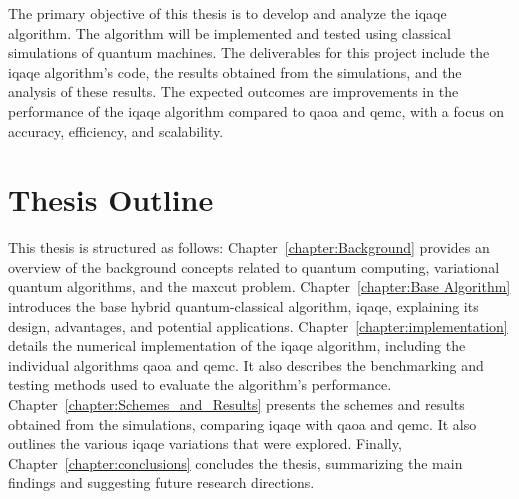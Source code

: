 
The primary objective of this thesis is to develop and analyze the \acrshort{iqaqe} algorithm. The algorithm will be implemented and tested using classical simulations of quantum machines. The deliverables for this project include the \acrshort{iqaqe} algorithm's code, the results obtained from the simulations, and the analysis of these results. The expected outcomes are improvements in the performance of the \acrshort{iqaqe} algorithm compared to \acrshort{qaoa} and \acrshort{qemc}, with a focus on accuracy, efficiency, and scalability.

\section{Thesis Outline}
\label{section:outline}




This thesis is structured as follows: Chapter~\ref{chapter:Background} provides an overview of the background concepts related to quantum computing, variational quantum algorithms, and the \acrshort{maxcut} problem. Chapter~\ref{chapter:Base Algorithm} introduces the base hybrid quantum-classical algorithm, \acrshort{iqaqe}, explaining its design, advantages, and potential applications. Chapter~\ref{chapter:implementation} details the numerical implementation of the \acrshort{iqaqe} algorithm, including the individual algorithms \acrshort{qaoa} and \acrshort{qemc}. It also describes the benchmarking and testing methods used to evaluate the algorithm's performance. Chapter~\ref{chapter:Schemes_and_Results} presents the schemes and results obtained from the simulations, comparing \acrshort{iqaqe} with \acrshort{qaoa} and \acrshort{qemc}. It also outlines the various \acrshort{iqaqe} variations that were explored. Finally, Chapter~\ref{chapter:conclusions} concludes the thesis, summarizing the main findings and suggesting future research directions.
